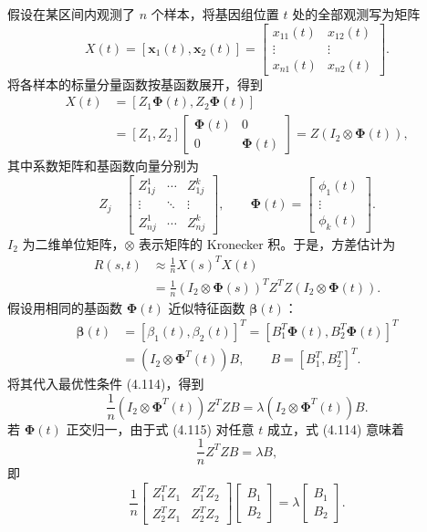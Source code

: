 假设在某区间内观测了 $n$ 个样本，将基因组位置 $t$ 处的全部观测写为矩阵
\[
X(t)=[\mathbf x_1(t),\mathbf x_2(t)]
=\begin{bmatrix}x_{11}(t)&x_{12}(t)\\\vdots&\vdots\\x_{n1}(t)&x_{n2}(t)\end{bmatrix}.
\]
将各样本的标量分量函数按基函数展开，得到
\[
\begin{aligned}
X(t)&=[Z_1\boldsymbol\Phi(t),Z_2\boldsymbol\Phi(t)]\\
&=[Z_1,Z_2]\begin{bmatrix}\boldsymbol\Phi(t)&0\\0&\boldsymbol\Phi(t)\end{bmatrix}
=Z(I_2\otimes\boldsymbol\Phi(t)),
\end{aligned}
\]
其中系数矩阵和基函数向量分别为
\[
Z_j\quad\begin{bmatrix}Z_{1j}^1&\cdots&Z_{1j}^k\\\vdots&\ddots&\vdots\\Z_{nj}^1&\cdots&Z_{nj}^k\end{bmatrix},
\qquad
\boldsymbol\Phi(t)=\begin{bmatrix}\phi_1(t)\\\vdots\\\phi_k(t)\end{bmatrix}.
\]
$I_2$ 为二维单位矩阵，$\otimes$ 表示矩阵的 Kronecker 积。于是，方差估计为
\[
\begin{aligned}
R(s,t)&\approx\frac1n X(s)^TX(t)\\
&=\frac1n(I_2\otimes\boldsymbol\Phi(s))^TZ^TZ(I_2\otimes\boldsymbol\Phi(t)).
\end{aligned}
\]
假设用相同的基函数 $\boldsymbol\Phi(t)$ 近似特征函数 $\boldsymbol\beta(t)$：
\[
\begin{aligned}
\boldsymbol\beta(t)&=[\beta_1(t),\beta_2(t)]^T
=[B_1^T\boldsymbol\Phi(t),B_2^T\boldsymbol\Phi(t)]^T\\
&=(I_2\otimes\boldsymbol\Phi^T(t))B,\qquad B=[B_1^T,B_2^T]^T.
\end{aligned}
\]
将其代入最优性条件 (4.114)，得到
\begin{equation}
\frac1n(I_2\otimes\boldsymbol\Phi^T(t))Z^TZB
=\lambda(I_2\otimes\boldsymbol\Phi^T(t))B.
\tag{4.115}
\end{equation}
若 $\boldsymbol\Phi(t)$ 正交归一，由于式 (4.115) 对任意 $t$ 成立，式 (4.114) 意味着
\[
\frac1n Z^TZB=\lambda B,
\]
即
\begin{equation}
\frac1n\begin{bmatrix}Z_1^TZ_1&Z_1^TZ_2\\Z_2^TZ_1&Z_2^TZ_2\end{bmatrix}
\begin{bmatrix}B_1\\B_2\end{bmatrix}
=\lambda\begin{bmatrix}B_1\\B_2\end{bmatrix}.
\tag{4.116}
\end{equation}
